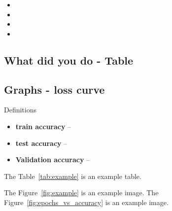 \documentclass[sigplan,screen]{acmart}
\begin{document}
\begin{itemize}
    \item 
    \item 
    \item 
    \item
\end{itemize}


\subsection{What did you do - Table}

\subsection{Graphs -  loss curve}

Definitions

\begin{itemize}

\item {\bf train accuracy} -- 

\item {\bf test accuracy} -- 

\item {\bf Validation accuracy} -- 

\end{itemize}

The Table~\ref{tab:example}  is an example table.

\begin{table}[!ht]
    \caption{The best 20 accuracy values sorted by xyz Accuracy with rank 1 representing the best value}
    \label{tab:rank}
    \label{tab:example}
    \centering
\end{table}



The Figure~\ref{fig:example} is an example image.
The Figure~\ref{fig:epochs_vs_accuracy} is an example image.
\end{document}
